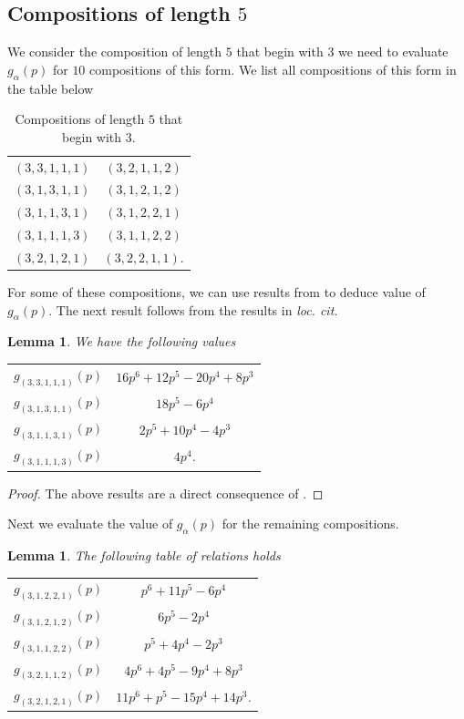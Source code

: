 \documentclass[a4paper]{amsart}
\newtheorem{lemma}[theorem]{Lemma}
\numberwithin{equation}{section}
\theoremstyle{remark}
\begin{document}
\subsection{Compositions of length $5$} We consider the composition of length $5$ that begin with $3$ we need to evaluate $g_{\alpha}(p)$ for $10$ compositions of this form. We list all compositions of this form in the table below\\
\begin{table}[H]
\centering
\begin{tabular}{c c } 
\hline
$(3,3,1,1,1)$ & $(3,2,1,1,2)$\\ 
$(3,1,3,1,1)$ & $(3,1,2,1,2)$\\
$(3,1,1,3,1)$ & $(3,1,2,2,1)$\\
$(3,1,1,1,3)$ & $(3,1,1,2,2)$\\
$(3,2,1,2,1)$ & $(3,2,2,1,1)$.\\
\hline
\end{tabular}
\caption{Compositions of length $5$ that begin with $3$.}
\end{table}
For some of these compositions, we can use results from \cite{isham2022number} to deduce value of $g_{\alpha}(p)$. The next result follows from the results in \emph{loc. cit.}
\begin{lemma}
We have the following values
\begin{table}[H]
\centering
 \begin{tabular}{c c } 
 \hline
 $g_{(3,3,1,1,1)}(p)$ & $16 p^6 + 12 p^5 - 20 p^4 + 8 p^3$\\ 
 $g_{(3,1,3,1,1)}(p)$ & $18 p^5 - 6 p^4$\\
 $g_{(3,1,1,3,1)}(p)$ & $2 p^5 + 10 p^4 - 4 p^3$\\
 $g_{(3,1,1,1,3)}(p)$ & $4p^4$.\\
\hline
\end{tabular}
\end{table}
\end{lemma}
\begin{proof}
    The above results are a direct consequence of \cite[Lemma 4.6]{isham2022number}.
\end{proof}
Next we evaluate the value of $g_{\alpha}(p)$ for the remaining compositions.
\begin{lemma}
The following table of relations holds
\begin{table}[H]
\centering
 \begin{tabular}{c c } 
 \hline
 $g_{(3,1,2,2,1)}(p)$ & $p^6+11p^5-6p^4$\\ 
 $g_{(3,1,2,1,2)}(p)$ & $6p^5-2p^4$\\
 $g_{(3,1,1,2,2)}(p)$ & $p^5+4p^4-2p^3$\\
 $g_{(3,2,1,1,2)}(p)$ & $4p^6+4p^5-9p^4+8p^3$\\
 $g_{(3,2,1,2,1)}(p)$ & $11p^6+p^5-15p^4+14p^3$.\\
\hline
\end{tabular}
\end{table}
\end{lemma}
\end{document}
